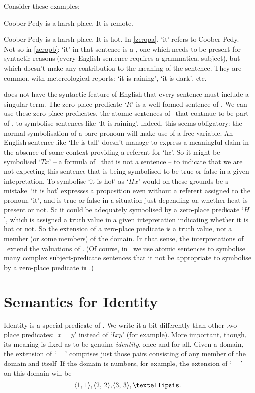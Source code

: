Consider these examples:  \begin{earg}
\item[\ex{zeropa}] Coober Pedy is a harsh place. It is remote.
\item[\ex{zeropb}] Coober Pedy is a harsh place. It is hot.
In \ref{zeropa}, `it' refers to Coober Pedy. Not so in \ref{zeropb}: `it' in that sentence is a , one which needs to be present for syntactic reasons (every English sentence requires a grammatical subject), but which doesn't make any contribution to the meaning of the sentence. They are common with metereological reports: `it is raining', `it is dark', etc. 

\FOL does not have the syntactic feature of English that every sentence must include a singular term. The zero-place predicate `$R$' is a well-formed sentence of \FOL. We can use these zero-place predicates, the atomic sentences of \TFL\ that continue to be part of \FOL, to symbolise sentences like `It is raining'. Indeed, this seems obligatory: the normal symbolisation of a bare pronoun will make use of a free variable. An English sentence like `He is tall' doesn't manage to express a meaningful claim in the absence of some context providing a referent for `he'. So it might be symbolised `$Tx$' – a formula of \FOL\ that is not a sentence – to indicate that we are not expecting this sentence that is being symbolised to be true or false in a given intepretation. To symbolise `it is hot' as `$Hx$' would on these grounds be a mistake: `it is hot' expresses a proposition even without a referent assigned to the pronoun `it', and is true or false in a situation just depending on whether heat is present or not. So it could be adequately symbolised by a zero-place predicate `$H$', which is assigned a truth value in a given intepretation indicating whether it is hot or not. So the extension of a zero-place predicate is a truth value, not a member (or some members) of the domain. In that sense, the interpretations of \FOL\ extend the valuations of \TFL. (Of course, in \TFL\ we use atomic sentences to symbolise many complex subject-predicate sentences that it not be appropriate to symbolise by a zero-place predicate in \FOL.)


\section{Semantics for Identity}
Identity is a special predicate of \FOL. We write it a bit differently than other two-place predicates: `$x=y$' instead of `$Ixy$' (for example). More important, though, its meaning is fixed as to be genuine \emph{identity}, once and for all. Given a domain, the extension of `$=$' comprises just those pairs consisting of any member of the domain and itself. If the domain is numbers, for example, the extension of `$=$' on this domain will be $$\ntuple{1, 1}, \ntuple{2, 2}, \ntuple{3, 3},….$$ 


\end{earg}
